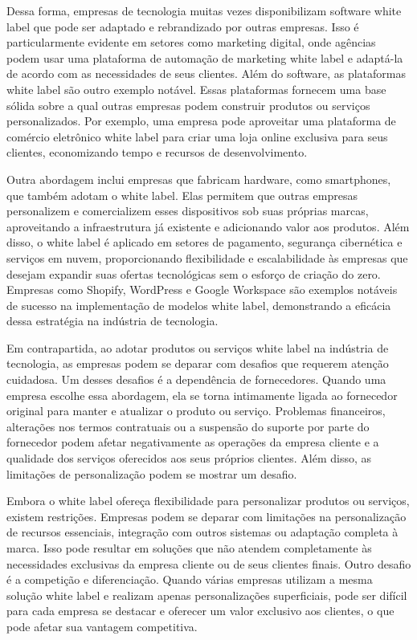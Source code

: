 Dessa forma, empresas de tecnologia muitas vezes disponibilizam software white label que pode ser adaptado e rebrandizado por outras empresas. Isso é particularmente evidente em setores como marketing digital, onde agências podem usar uma plataforma de automação de marketing white label e adaptá-la de acordo com as necessidades de seus clientes. Além do software, as plataformas white label são outro exemplo notável. Essas plataformas fornecem uma base sólida sobre a qual outras empresas podem construir produtos ou serviços personalizados. Por exemplo, uma empresa pode aproveitar uma plataforma de comércio eletrônico white label para criar uma loja online exclusiva para seus clientes, economizando tempo e recursos de desenvolvimento. 

Outra abordagem inclui empresas que fabricam hardware, como smartphones, que também adotam o white label. Elas permitem que outras empresas personalizem e comercializem esses dispositivos sob suas próprias marcas, aproveitando a infraestrutura já existente e adicionando valor aos produtos. Além disso, o white label é aplicado em setores de pagamento, segurança cibernética e serviços em nuvem, proporcionando flexibilidade e escalabilidade às empresas que desejam expandir suas ofertas tecnológicas sem o esforço de criação do zero. Empresas como Shopify, WordPress e Google Workspace são exemplos notáveis de sucesso na implementação de modelos white label, demonstrando a eficácia dessa estratégia na indústria de tecnologia. 

Em contrapartida, ao adotar produtos ou serviços white label na indústria de tecnologia, as empresas podem se deparar com desafios que requerem atenção cuidadosa. Um desses desafios é a dependência de fornecedores. Quando uma empresa escolhe essa abordagem, ela se torna intimamente ligada ao fornecedor original para manter e atualizar o produto ou serviço. Problemas financeiros, alterações nos termos contratuais ou a suspensão do suporte por parte do fornecedor podem afetar negativamente as operações da empresa cliente e a qualidade dos serviços oferecidos aos seus próprios clientes. Além disso, as limitações de personalização podem se mostrar um desafio. 

Embora o white label ofereça flexibilidade para personalizar produtos ou serviços, existem restrições. Empresas podem se deparar com limitações na personalização de recursos essenciais, integração com outros sistemas ou adaptação completa à marca. Isso pode resultar em soluções que não atendem completamente às necessidades exclusivas da empresa cliente ou de seus clientes finais. Outro desafio é a competição e diferenciação. Quando várias empresas utilizam a mesma solução white label e realizam apenas personalizações superficiais, pode ser difícil para cada empresa se destacar e oferecer um valor exclusivo aos clientes, o que pode afetar sua vantagem competitiva. 

